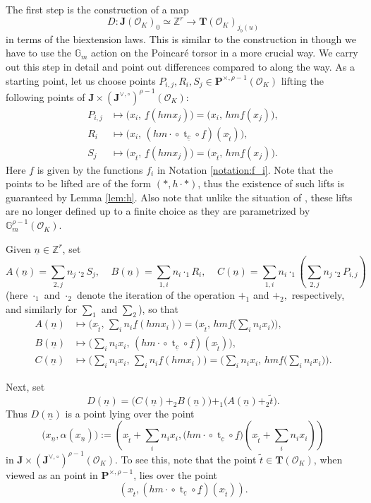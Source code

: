 \documentclass[11pt,oneside]{amsart}
\theoremstyle{plain}
\theoremstyle{definition}
\def\lra{{\longrightarrow}}
\def\G{{\bf G}}
\DeclareMathOperator{\tr}{t}
\def\TT{\mathbf{T}}
\def\Z{\mathbb{Z}}
\def\J{\mathbf{J}}
\def\Jo{\mathbf{J}^{\vee,\circ}}
\def\G{\mathbb{G}}
\def\P{\mathbf{P}}
\def\oh{\mathcal{O}}
\begin{document}
The first step is the construction of a map 
\[ 
D : \J(\oh_K)_0 \simeq \Z^r \lra \TT(\oh_K)_{j_b(u)}
\]
in terms of the biextension laws. This is similar to the construction in \cite[\S 4]{EL19} though we have to use the $\G_m$ action on the Poincar\'e torsor in a more crucial way. We carry out this step in detail and point out differences compared to \cite{EL19} along the way. As a starting point, let us choose points $P_{i, j}, R_{i}, S_{j} \in \P^{\times, \rho-1}(\oh_K)$ lifting the following points of $\J \times (\Jo)^{\rho-1}(\oh_K):$ 
\begin{align*}
P_{i, j} &\longmapsto \Big(x_i,\, \underline{f}(hmx_j)\Big)=\Big(x_i,\, hm\underline{f}(x_j)\Big),\\
R_{i} &\longmapsto \Big(x_i,\, ({hm\cdot}\circ \tr_{\underline{c}}\circ \underline{f})(x_{\tilde{t}})\Big),\\
S_{j} &\longmapsto \Big(x_{\tilde{t}},\, \underline{f}(hmx_j)\Big)=\Big(x_{\tilde{t}},\, hm\underline{f}(x_j)\Big).
\end{align*}
Here $\underline{f}$ is given by the functions $f_i$ in Notation \ref{notation:f_i}. 
Note that the points to be lifted are of the form $(*, h\cdot *)$, thus the existence of such lifts is guaranteed by Lemma \ref{lem:h}. Also note that unlike the situation of \cite{EL19}, these lifts are no longer defined up to a finite choice as they are parametrized by $\G_m^{\rho-1}(\oh_K)$. 

Given $\underline{n} \in \Z^{r}$, set
$$A(\underline{n})={\sum}_{2, j}n_j \cdot_2 S_j,\;\;\;\; B(\underline{n})={\sum}_{1, i}n_i \cdot_1 R_i,\;\;\;\; C(\underline{n})={\sum}_{1, i}n_i \cdot_1 \left( {\sum}_{2, j}n_j \cdot_2 P_{i, j} \right)$$
(here $\cdot_1$ and $\cdot_2$ denote the iteration of the operation $+_1$ and $+_2,$ respectively, and similarly for $\sum_1$ and $\sum_2$), so that
\begin{align*}
A(\underline{n}) &\longmapsto \Big(x_{\tilde{t}},\, \sum_{i}n_i\underline{f}(hmx_i)\Big)=\Big(x_{\tilde{t}},\, hm\underline{f}\big(\sum_{i}n_ix_i\big)\Big),\\
B(\underline{n}) &\longmapsto \Big(\sum_i n_i x_i,\, ({hm\cdot}\circ \tr_{\underline{c}}\circ \underline{f})(x_{\tilde{t}})\Big),\\
C(\underline{n}) &\longmapsto \Big(\sum_i n_i x_i,\, \sum_{i}n_i\underline{f}(hmx_i)\Big)=\Big(\sum_i n_i x_i,\, hm\underline{f}\big(\sum_{i}n_ix_i\big)\Big).
\end{align*}
 
Next, set 
$$D(\underline{n})=\big(C(\underline{n})+_2B(\underline{n})\big)+_1\big(A(\underline{n})+_2\tilde{t}\big).$$
Thus $D(\underline{n})$ is a point lying over the point
$$\big(x_{\underline{n}}, \alpha(x_{\underline{n}})\big):=\left(x_{\tilde{t}} + \sum_{i}n_ix_i, \big({hm\cdot} \circ \tr_{\underline{c}}\circ \underline{f}\big)\left(x_{\tilde{t}}+ \sum_in_i x_i\right) \right)$$
in $\J\times (\Jo)^{\rho-1}(\oh_K)$. To see this, note that the point $\tilde{t} \in \TT (\oh_K)$, when viewed as an point in $\P^{\times, \rho-1}$, lies over the point 
$$(x_{\tilde{t}}, ({hm\cdot}\circ \tr_{\underline{c}}\circ \underline{f})(x_{\tilde{t}}) ).$$
\end{document}
